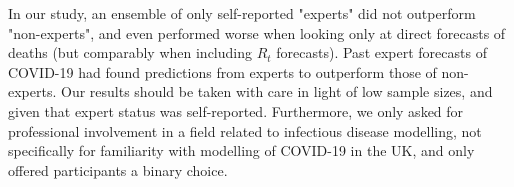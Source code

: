 \documentclass[10pt,a4paper,twocolumn]{article}
\begin{document}

In our study, an ensemble of only self-reported "experts" did not outperform "non-experts", and even performed worse when looking only at direct forecasts of deaths (but comparably when including $R_t$ forecasts). Past expert forecasts of COVID-19 \cite{recchiaHowWellDid2021} had found predictions from experts to outperform those of non-experts. Our results should be taken with care in light of low sample sizes, and given that expert status was self-reported. Furthermore, we only asked for professional involvement in a field related to infectious disease modelling, not specifically for familiarity with modelling of COVID-19 in the UK, and only offered participants a binary choice. 



\end{document}
